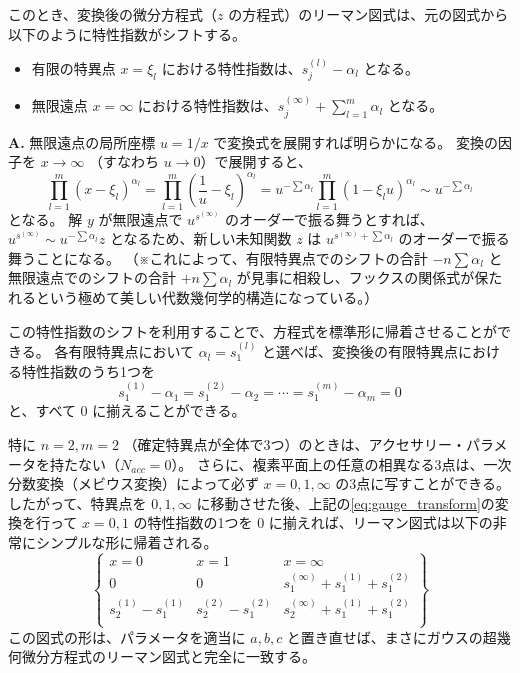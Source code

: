 このとき、変換後の微分方程式（$z$ の方程式）のリーマン図式は、元の図式から以下のように特性指数がシフトする。
\begin{itemize}
    \item 有限の特異点 $x=\xi_{l}$ における特性指数は、$s_{j}^{(l)} - \alpha_{l}$ となる。
    \item 無限遠点 $x=\infty$ における特性指数は、$s_{j}^{(\infty)} + \sum_{l=1}^{m} \alpha_{l}$ となる。
\end{itemize}

\begin{Q}
\textbf{A.} 無限遠点の局所座標 $u=1/x$ で変換式を展開すれば明らかになる。
変換の因子を $x \to \infty$ （すなわち $u \to 0$）で展開すると、
\[
\prod_{l=1}^{m} (x-\xi_{l})^{\alpha_{l}} = \prod_{l=1}^{m} \left( \frac{1}{u} - \xi_{l} \right)^{\alpha_{l}} = u^{-\sum \alpha_{l}} \prod_{l=1}^{m} (1 - \xi_{l}u)^{\alpha_{l}} \sim u^{-\sum \alpha_{l}}
\]
となる。
解 $y$ が無限遠点で $u^{s^{(\infty)}}$ のオーダーで振る舞うとすれば、$u^{s^{(\infty)}} \sim u^{-\sum \alpha_{l}} z$ となるため、新しい未知関数 $z$ は $u^{s^{(\infty)} + \sum \alpha_{l}}$ のオーダーで振る舞うことになる。
（※これによって、有限特異点でのシフトの合計 $-n\sum \alpha_{l}$ と無限遠点でのシフトの合計 $+n\sum \alpha_{l}$ が見事に相殺し、フックスの関係式が保たれるという極めて美しい代数幾何学的構造になっている。）
\end{Q}

この特性指数のシフトを利用することで、方程式を標準形に帰着させることができる。
各有限特異点において $\alpha_{l} = s_{1}^{(l)}$ と選べば、変換後の有限特異点における特性指数のうち1つを
\[
s_{1}^{(1)} - \alpha_{1} = s_{1}^{(2)} - \alpha_{2} = \cdots = s_{1}^{(m)} - \alpha_{m} = 0
\]
と、すべて $0$ に揃えることができる。

特に $n=2, m=2$ （確定特異点が全体で3つ）のときは、アクセサリー・パラメータを持たない（$N_{acc}=0$）。
さらに、複素平面上の任意の相異なる3点は、一次分数変換（メビウス変換）によって必ず $x=0, 1, \infty$ の3点に写すことができる。
したがって、特異点を $0, 1, \infty$ に移動させた後、上記の\eqref{eq:gauge_transform}の変換を行って $x=0, 1$ の特性指数の1つを $0$ に揃えれば、リーマン図式は以下の非常にシンプルな形に帰着される。
\[
    \left\{
    \begin{matrix}
        x = 0 & x = 1 & x = \infty \\
        0 & 0 & s_{1}^{(\infty)} + s_{1}^{(1)} + s_{1}^{(2)} \\
        s_{2}^{(1)} - s_{1}^{(1)} & s_{2}^{(2)} - s_{1}^{(2)} & s_{2}^{(\infty)} + s_{1}^{(1)} + s_{1}^{(2)} \\
    \end{matrix}
    \right\}
\]
この図式の形は、パラメータを適当に $a, b, c$ と置き直せば、まさにガウスの超幾何微分方程式のリーマン図式と完全に一致する。

